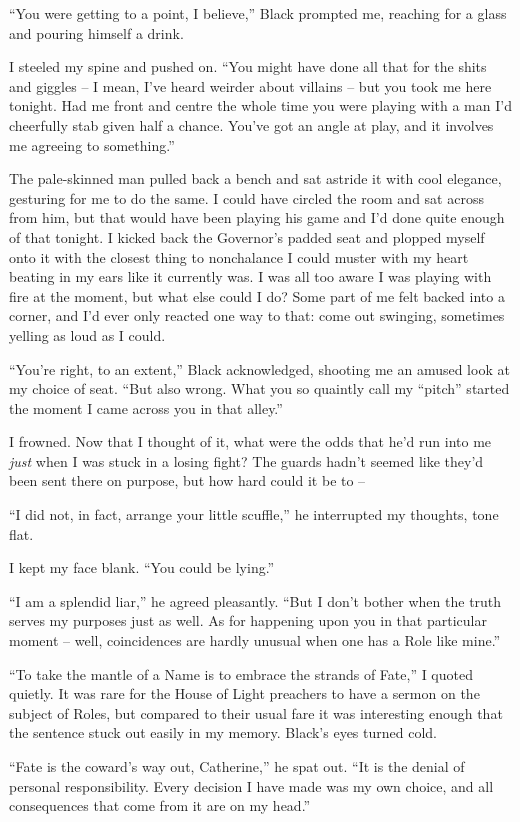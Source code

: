 \documentclass[12pt, openany]{book}
\begin{document}
“You were getting to a point, I believe,” Black prompted me, reaching for a glass and pouring himself a drink.

I steeled my spine and pushed on. “You might have done all that for the shits and giggles – I mean, I’ve heard weirder about villains – but you took me here tonight. Had me front and centre the whole time you were playing with a man I’d cheerfully stab given half a chance. You’ve got an angle at play, and it involves me agreeing to something.”

The pale-skinned man pulled back a bench and sat astride it with cool elegance, gesturing for me to do the same. I could have circled the room and sat across from him, but that would have been playing his game and I’d done quite enough of that tonight. I kicked back the Governor’s padded seat and plopped myself onto it with the closest thing to nonchalance I could muster with my heart beating in my ears like it currently was. I was all too aware I was playing with fire at the moment, but what else could I do? Some part of me felt backed into a corner, and I’d ever only reacted one way to that: come out swinging, sometimes yelling as loud as I could.

“You’re right, to an extent,” Black acknowledged, shooting me an amused look at my choice of seat. “But also wrong. What you so quaintly call my “pitch” started the moment I came across you in that alley.”

I frowned. Now that I thought of it, what were the odds that he’d run into me \textit{just} when I was stuck in a losing fight? The guards hadn’t seemed like they’d been sent there on purpose, but how hard could it be to –

“I did not, in fact, arrange your little scuffle,” he interrupted my thoughts, tone flat.

I kept my face blank. “You could be lying.”

“I am a splendid liar,” he agreed pleasantly. “But I don’t bother when the truth serves my purposes just as well. As for happening upon you in that particular moment – well, coincidences are hardly unusual when one has a Role like mine.”

“To take the mantle of a Name is to embrace the strands of Fate,” I quoted quietly. It was rare for the House of Light preachers to have a sermon on the subject of Roles, but compared to their usual fare it was interesting enough that the sentence stuck out easily in my memory. Black’s eyes turned cold.

“Fate is the coward’s way out, Catherine,” he spat out. “It is the denial of personal responsibility. Every decision I have made was my own choice, and all consequences that come from it are on my head.”
\end{document}
